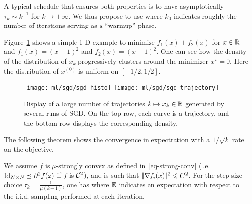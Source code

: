 A typical schedule that ensures both properties is to have asymptotically $\tau_k \sim k^{-1}$ for
$k\rightarrow +\infty$. We thus propose to use 
where $k_0$ indicates roughly the number of iterations serving as a
``warmup'' phase.

Figure~\ref{fig-sgd-traject} shows a simple 1-D example to minimize $f_1(x)+f_2(x)$ for $x \in \mathbb{R}$ and $f_1(x)=(x-1)^2$ and $f_2(x)=(x+1)^2$. One can see how the density of the distribution of $x_k$ progressively clusters around the minimizer $x^\star=0$. Here the distribution of $x^{(0)}$ is uniform on $[-1/2,1/2]$.

\begin{figure}
\centering
\texttt{[image: ml/sgd/sgd-histo]} 
\texttt{[image: ml/sgd/sgd-trajectory]}
\caption{\label{fig-sgd-traject}
Display of a large number of trajectories $k \mapsto x_k \in \mathbb{R}$ generated by several runs of SGD. On the top row, each curve is a trajectory, and the bottom row displays the corresponding density.
}
\end{figure}


The following theorem shows the convergence in expectration with a $1/\sqrt{k}$ rate on the objective.

\begin{thm}\label{thm-conv-sgd}
We assume $f$ is $\mu$-strongly convex as defined in~\eqref{eq-strong-conv} (i.e. $\mathrm{Id}_{N \times N}  \preceq \partial^2  f(x)$ if $f$ is $\mathcal{C}^2$), and is such that $|\!| \nabla f_i(x) |\!|^2 \leqslant C^2$. 
For the step size choice $\tau_k = \frac{1}{\mu (k+1)}$, one has
where $\mathbb{E}$ indicates an expectation with respect to the i.i.d.
sampling performed at each iteration.
\end{thm}

